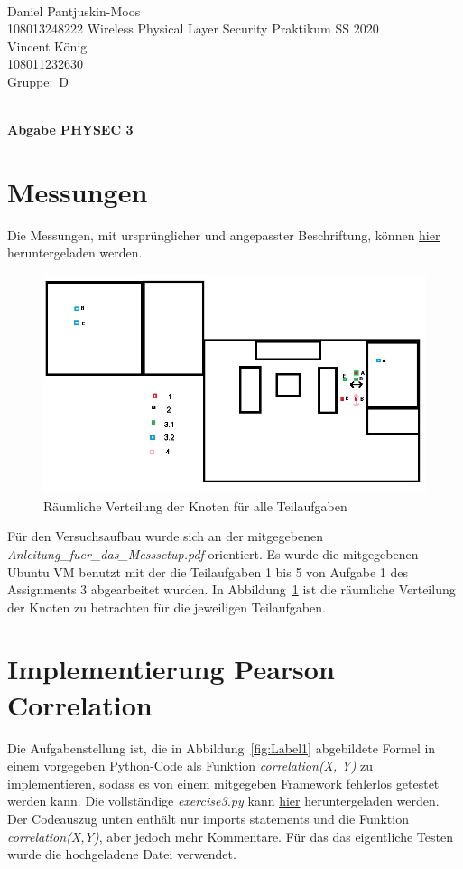 \documentclass[12pt,a4paper]{article}
\newcommand{\student}{Daniel Pantjuskin-Moos\\ 108013248222 } %
\newcommand{\partner}{Vincent König\\ 108011232630} %
\newcommand{\group}{D} %
\newcommand{\hwheadtwo}{$ $
  \vspace{-2cm}
  
\noindent \student \qquad \qquad  Wireless Physical Layer Security Praktikum \hfill SS 2020 \\
\noindent \partner \\
\noindent Gruppe:~\group\\
$ $

  
\begin{center}    
{\Large \bf Abgabe PHYSEC 3}
\end{center}
}
\begin{document}
\hwheadtwo

\section{Messungen}

Die Messungen, mit ursprünglicher und angepasster Beschriftung,
können
\href{https://mega.nz/file/i05RXJ7Z#q_9HW7KM_qgKp6tv9JaJFxkw3PNMyVnuvYIgViiNqi8}
{hier}
heruntergeladen werden.

\begin{figure}[hbt!]
	\centering
		\includegraphics[width=1\textwidth ]
		{Bilder/a1.jpg}
		\caption{Räumliche Verteilung der Knoten für alle Teilaufgaben}
		\label{fig:Label0}
\end{figure}

Für den Versuchsaufbau wurde sich an der mitgegebenen 
\textit{Anleitung\_fuer\_das\_Messsetup.pdf} orientiert. 
Es wurde die mitgegebenen Ubuntu VM benutzt mit der 
die Teilaufgaben 1 bis 5 von Aufgabe 1 des Assignments 
3 abgearbeitet wurden. In Abbildung~\ref{fig:Label0}
ist die räumliche Verteilung der Knoten zu betrachten
für die jeweiligen Teilaufgaben.


\newpage
\section{Implementierung Pearson Correlation}


Die Aufgabenstellung ist, die in Abbildung~\ref{fig:Label1}
abgebildete Formel in einem vorgegeben Python-Code als 
Funktion \textit{correlation(X, Y)} zu implementieren, sodass 
es von einem mitgegeben Framework fehlerlos getestet werden 
kann. Die vollständige \textit{exercise3.py} kann  
\href{https://mega.nz/file/7gwx0BwR#dwkLdHX7AglZKYwp9poGQ-tEL20GtaqFy8LoT4TtV_g}
{hier} 
heruntergeladen werden. Der Codeauszug unten enthält nur imports
statements und die Funktion \textit{correlation(X,Y)}, aber jedoch
mehr Kommentare. Für das das eigentliche Testen wurde die 
hochgeladene Datei verwendet.
\end{document}
